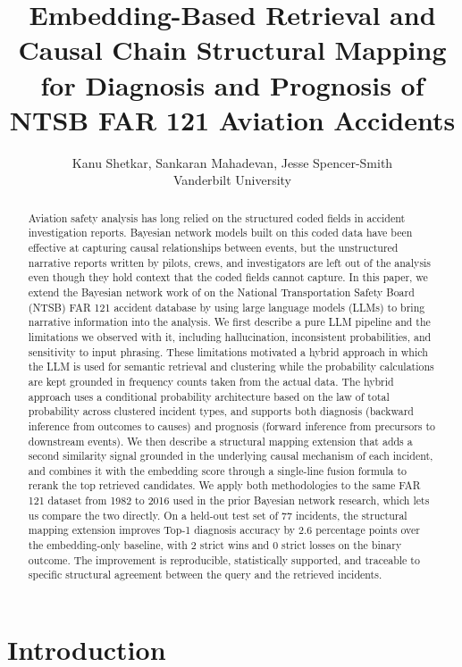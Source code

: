 \documentclass[11pt]{article}
\title{Embedding-Based Retrieval and Causal Chain Structural Mapping for Diagnosis and Prognosis of NTSB FAR 121 Aviation Accidents}
\author{Kanu Shetkar, Sankaran Mahadevan, Jesse Spencer-Smith \\[0.3em]
Vanderbilt University}
\date{}
\begin{document}
\maketitle

\begin{abstract}
Aviation safety analysis has long relied on the structured coded fields in accident investigation reports. Bayesian network models built on this coded data have been effective at capturing causal relationships between events, but the unstructured narrative reports written by pilots, crews, and investigators are left out of the analysis even though they hold context that the coded fields cannot capture. In this paper, we extend the Bayesian network work of \citet{ZhangMahadevan2021} on the National Transportation Safety Board (NTSB) FAR 121 accident database by using large language models (LLMs) to bring narrative information into the analysis. We first describe a pure LLM pipeline and the limitations we observed with it, including hallucination, inconsistent probabilities, and sensitivity to input phrasing. These limitations motivated a hybrid approach in which the LLM is used for semantic retrieval and clustering while the probability calculations are kept grounded in frequency counts taken from the actual data. The hybrid approach uses a conditional probability architecture based on the law of total probability across clustered incident types, and supports both diagnosis (backward inference from outcomes to causes) and prognosis (forward inference from precursors to downstream events). We then describe a structural mapping extension that adds a second similarity signal grounded in the underlying causal mechanism of each incident, and combines it with the embedding score through a single-line fusion formula to rerank the top retrieved candidates. We apply both methodologies to the same FAR 121 dataset from 1982 to 2016 used in the prior Bayesian network research, which lets us compare the two directly. On a held-out test set of 77 incidents, the structural mapping extension improves Top-1 diagnosis accuracy by 2.6 percentage points over the embedding-only baseline, with 2 strict wins and 0 strict losses on the binary outcome. The improvement is reproducible, statistically supported, and traceable to specific structural agreement between the query and the retrieved incidents.
\end{abstract}

\section{Introduction}
\label{sec:intro}
\end{document}
